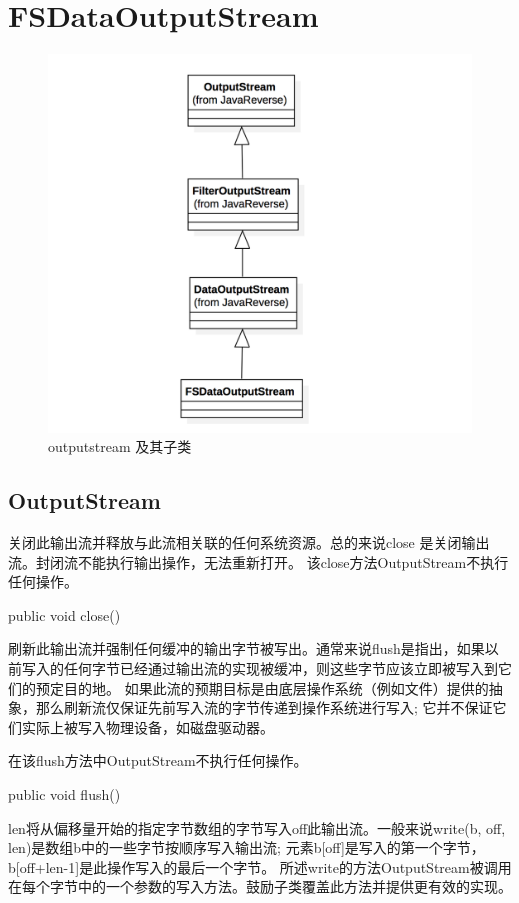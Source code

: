 \section{FSDataOutputStream}

\begin{figure}
\centering
\includegraphics[width =1\linewidth]
{uml/outputstream/11.png}
\caption{outputstream 及其子类}
\label{fig:OutputStream}
\end{figure}

\subsection{OutputStream}


关闭此输出流并释放与此流相关联的任何系统资源。总的来说close 是关闭输出流。封闭流不能执行输出操作，无法重新打开。
该close方法OutputStream不执行任何操作。
\begin{java}
public void close()
\end{java}
刷新此输出流并强制任何缓冲的输出字节被写出。通常来说flush是指出，如果以前写入的任何字节已经通过输出流的实现被缓冲，则这些字节应该立即被写入到它们的预定目的地。
如果此流的预期目标是由底层操作系统（例如文件）提供的抽象，那么刷新流仅保证先前写入流的字节传递到操作系统进行写入; 它并不保证它们实际上被写入物理设备，如磁盘驱动器。

在该flush方法中OutputStream不执行任何操作。
\begin{java}
public void flush()
\end{java}
len将从偏移量开始的指定字节数组的字节写入off此输出流。一般来说write(b, off, len)是数组b中的一些字节按顺序写入输出流; 元素b[off]是写入的第一个字节，b[off+len-1]是此操作写入的最后一个字节。
所述write的方法OutputStream被调用在每个字节中的一个参数的写入方法。鼓励子类覆盖此方法并提供更有效的实现。

